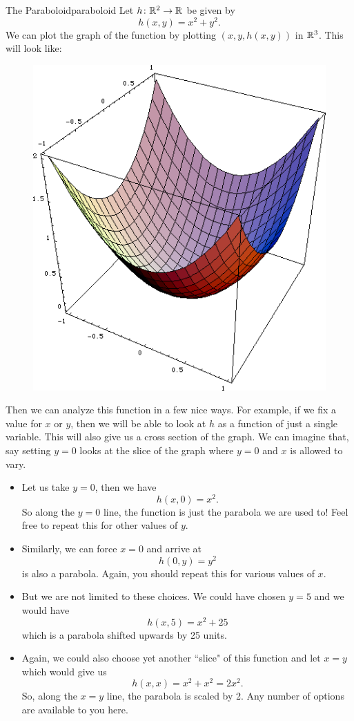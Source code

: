                 \begin{ex}{The Paraboloid}{paraboloid}
                Let $h\colon \mathbb{R}^2 \to \mathbb{R}$ be given by
                \[
                h(x,y)=x^2+y^2.
                \]
                We can plot the graph of the function by plotting $(x,y, h(x,y))$ in $\mathbb{R}^3$.  This will look like:
                \begin{figure}[H]
                    \centering
                    \includegraphics[width=.4\textwidth]{Figures_Part_6/paraboloid.png}
                \end{figure}
                Then we can analyze this function in a few nice ways. For example, if we fix a value for $x$ or $y$, then we will be able to look at $h$ as a function of just a single variable. This will also give us a cross section of the graph. We can imagine that, say setting $y=0$ looks at the slice of the graph where $y=0$ and $x$ is allowed to vary.

                \begin{itemize}
                \item Let us take $y=0$, then we have
                \[
                h(x,0)=x^2.
                \]
                So along the $y=0$ line, the function is just the parabola we are used to! Feel free to repeat this for other values of $y$. 
                
                \item Similarly, we can force $x=0$ and arrive at
                \[
                h(0,y)=y^2
                \]
                is also a parabola.  Again, you should repeat this for various values of $x$.
                
                \item But we are not limited to these choices.  We could have chosen $y=5$ and we would have
                \[
                h(x,5)=x^2+25
                \]
                which is a parabola shifted upwards by 25 units.
                
                \item  Again, we could also choose yet another ``slice" of this function and let $x=y$ which would give us
                \[
                h(x,x)=x^2+x^2=2x^2.
                \]
                So, along the $x=y$ line, the parabola is scaled by 2. Any number of options are available to you here.
                \end{itemize}
                \end{ex}


